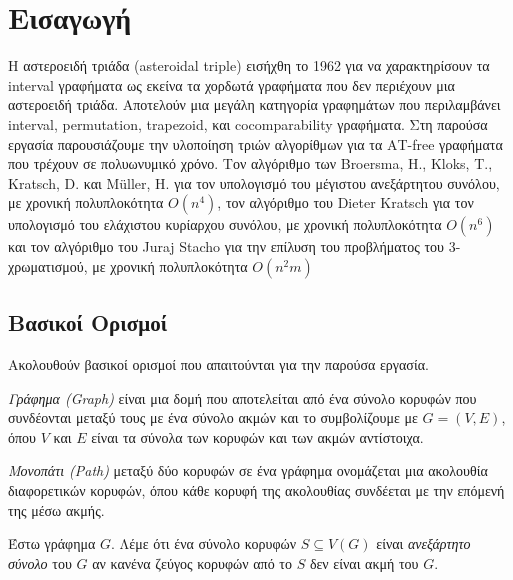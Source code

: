 \chapter{Εισαγωγή}
\label{ch:Introduction}

Η αστεροειδή τριάδα (asteroidal triple) εισήχθη το 1962 για να χαρακτηρίσουν τα interval γραφήματα ως εκείνα τα χορδωτά γραφήματα που δεν περιέχουν μια αστεροειδή τριάδα\cite{ref-20-independent-sets}. Αποτελούν μια μεγάλη κατηγορία γραφημάτων που περιλαμβάνει interval, permutation, trapezoid, και cocomparability γραφήματα.
Στη παρούσα εργασία παρουσιάζουμε την υλοποίηση τριών αλγορίθμων για τα ΑΤ-free γραφήματα που τρέχουν σε πολυωνυμικό χρόνο. Τον αλγόριθμο των Broersma, H., Kloks, T., Kratsch, D. και Müller, H.\cite{at-free-independent-sets} για τον υπολογισμό του μέγιστου ανεξάρτητου συνόλου, με χρονική πολυπλοκότητα $O(n^4)$, τον αλγόριθμο του Dieter Kratsch\cite{at-free-domination} για τον υπολογισμό του ελάχιστου κυρίαρχου συνόλου, με χρονική πολυπλοκότητα $O(n^6)$ και τον αλγόριθμο του Juraj Stacho\cite{at-free-3-colouring} για την επίλυση του προβλήματος του 3-χρωματισμού, με χρονική πολυπλοκότητα $O(n^2m)$

\section{Βασικοί Ορισμοί}
\label{sec:Definitions}

Ακολουθούν βασικοί ορισμοί που απαιτούνται για την παρούσα εργασία.

\begin{definition}
	\textit{Γράφημα (Graph)} είναι μια δομή που αποτελείται από ένα σύνολο κορυφών που συνδέονται μεταξύ τους με ένα σύνολο ακμών και το συμβολίζουμε με $G =(V,E)$, όπου $V$ και $E$ είναι τα σύνολα των κορυφών και των ακμών αντίστοιχα. 
\end{definition}


\begin{definition}
	\textit{Μονοπάτι (Path)} μεταξύ δύο κορυφών σε ένα γράφημα ονομάζεται μια ακολουθία διαφορετικών κορυφών, όπου κάθε κορυφή της ακολουθίας συνδέεται με την επόμενή της μέσω ακμής.
\end{definition}

\begin{definition}
	Έστω γράφημα $G$. Λέμε ότι ένα σύνολο κορυφών $S \subseteq V(G)$ είναι \textit{ανεξάρτητο σύνολο} του $G$ αν κανένα ζεύγος κορυφών από το $S$ δεν είναι ακμή του $G$. 
\end{definition}

